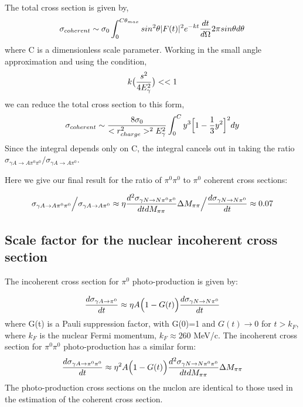   The total cross section is given by, 
  $$ \sigma_{coherent} \sim \sigma_0 \int^{C\theta_{max}}_0 sin^2 \theta |F(t)|^2 e^{-kt} {dt \over d\Omega} 2\pi sin\theta d\theta$$ 
  where C is a dimensionless scale parameter. Working in the small angle approximation
  and using the condition, 
 $$k\big( {s^2 \over 4 E^2_\gamma} \big) <<1$$
 we can reduce the total cross section  to this form, 
  $$ \sigma_{coherent} \sim {8\sigma_0 \over <r^2_{charge}>^2E^2_\gamma}
  \int^C_0 y^3 \Big[1- {1 \over 3} y^2 \Big]^2 dy  $$ 
  Since the integral depends only on C, the integral cancels out in taking the ratio
  $\sigma_{\gamma A \rightarrow A \pi^0 \pi^0}   \Big/  \sigma_{\gamma A \rightarrow A \pi^0} $. 
  
  Here we give our final result for the ratio of  $\pi^0 \pi^0$ to $\pi^0$  coherent cross sections:

$$  \sigma_{\gamma A \rightarrow A \pi^0 \pi^0}   \Big/  \sigma_{\gamma A \rightarrow A \pi^0}  \approx \eta 
 {d^2\sigma_{\gamma N \rightarrow N \pi^0 \pi^0} \over dt dM_{\pi \pi} } \Delta M_{\pi \pi} \Big/ { d\sigma_{\gamma N \rightarrow N \pi^0} \over dt} \approx 0.07 $$

\subsection{Scale factor for the nuclear incoherent cross section}

The incoherent cross section for  $\pi^0$ photo-production is given by: 

$$ {d\sigma_{\gamma A \rightarrow   \pi^0 } \over dt } \approx \eta A \Big(1 -G(t) \Big){ d\sigma_{\gamma N \rightarrow N \pi^0 } \over dt } $$
where G(t) is a Pauli suppression factor, with G(0)=1 and $G(t)\rightarrow 0$ for $t> k_F$, where $k_F$ is the nuclear Fermi momentum, $k_F\approx 260$ MeV/c. The incoherent cross section for  $\pi^0 \pi^0$ photo-production has a similar form: 
$$ {d\sigma_{\gamma A \rightarrow   \pi^0 \pi^0 } \over dt } \approx \eta^2 A \Big(1 -G(t) \Big){ d^2\sigma_{\gamma N \rightarrow N \pi^0 \pi^0 } \over dt dM_{\pi \pi}} \Delta M_{\pi \pi} $$
The photo-production cross sections on the nuclon are identical to those used in the estimation of the coherent cross section.   

